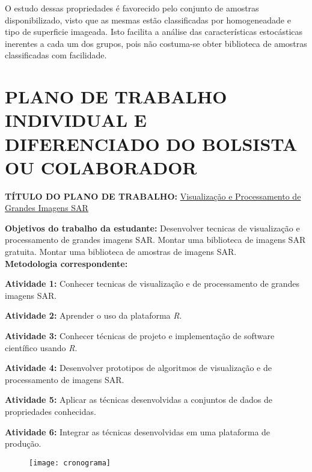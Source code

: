\documentclass[12pt,letterpaper]{article}
\begin{document}
O estudo dessas propriedades é favorecido pelo conjunto de amostras disponibilizado, visto que as mesmas estão classificadas por homogeneadade e tipo de superficie imageada. Isto facilita a análise das características estocásticas inerentes a cada um dos grupos, pois não costuma-se obter biblioteca de amostras classificadas com facilidade.

  
  \newpage




  
  \newpage

\section*{\centering \textbf{PLANO DE TRABALHO INDIVIDUAL E DIFERENCIADO DO BOLSISTA OU COLABORADOR}} %

\textbf{TÍTULO DO PLANO DE TRABALHO:} \underline{Visualização e Processamento de Grandes Imagens SAR}

\textbf{Objetivos do trabalho da estudante:} Desenvolver tecnicas de visualização e processamento de grandes imagens SAR. Montar uma biblioteca de imagens SAR gratuita. Montar uma biblioteca de amostras de imagens SAR.\\

\textbf{Metodologia correspondente:}

\textbf{Atividade 1:} Conhecer tecnicas de visualização e de processamento de grandes imagens SAR.

\textbf{Atividade 2:} Aprender o uso da plataforma \textit{R}.

\textbf{Atividade 3:} Conhecer técnicas de projeto e implementação de software científico usando \textit{R}.

\textbf{Atividade 4:} Desenvolver prototipos de algoritmos de visualização e de processamento de imagens SAR.

\textbf{Atividade 5:} Aplicar as técnicas desenvolvidas a conjuntos de dados de propriedades conhecidas.

\textbf{Atividade 6:} Integrar as técnicas desenvolvidas em uma plataforma de produção.\\

\begin{figure}[H]
\begin{center}
\texttt{[image: cronograma]}
\end{center}
\end{figure}
\end{document}
